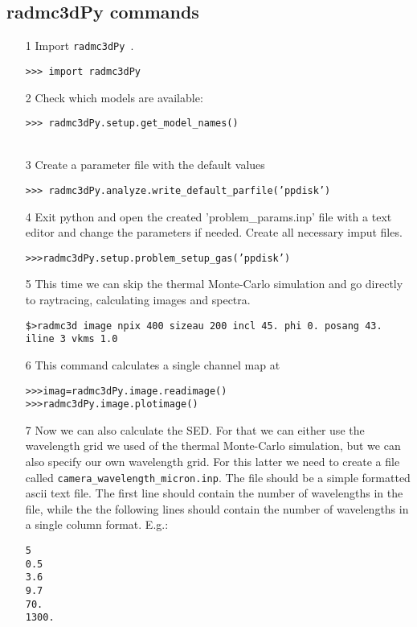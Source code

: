 \documentclass[12pt]{article}
\newcommand{\pymod}{{\tt  radmc3dPy }}
\begin{document}
\subsection*{radmc3dPy commands}
\begin{itemize}

\item[1] Import \pymod.

{\tt >>> import radmc3dPy}\\
\item[2] Check which models are available:

{\tt >>> radmc3dPy.setup.get\_model\_names()}\\
\indent {\tt ['ppdisk']}\\
\item[3] Create a parameter file with the default values

{\tt >>> radmc3dPy.analyze.write\_default\_parfile('ppdisk')}\\
\item[4] Exit python and open the created 'problem\_params.inp' file with a text editor and change the parameters if needed. 
Create all necessary imput files.

{\tt>>>radmc3dPy.setup.problem\_setup\_gas('ppdisk')}\\
\item[5] This time we can skip the thermal Monte-Carlo simulation and go directly to raytracing, calculating images
and spectra.

{\tt \$>radmc3d image npix 400 sizeau 200 incl 45. phi 0. posang 43. iline 3 vkms 1.0}\\
\item[6] This command calculates a single channel map at 

{\tt>>>imag=radmc3dPy.image.readimage()}\\
{\tt>>>radmc3dPy.image.plotimage()}
\item[7] Now we can also calculate the SED. For that we can  either use the wavelength grid we used of the thermal
Monte-Carlo simulation, but we can also specify our own wavelength grid. For this latter we need to create a file
called {\tt camera\_wavelength\_micron.inp}. The file should be a simple formatted ascii text file. The first line should
contain the number of wavelengths in the file, while the the following lines should contain the number of wavelengths
in a single column format. E.g.:
\begin{verbatim}
5
0.5
3.6
9.7
70.
1300.
\end{verbatim} 


\end{itemize}
\end{document}

